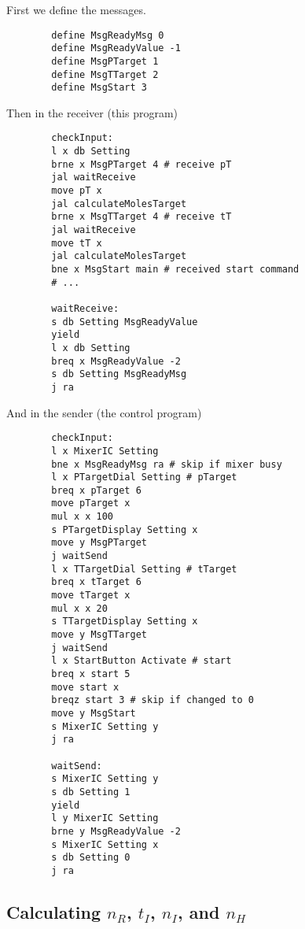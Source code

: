 \documentclass{article}
\begin{document}
\begin{paracol}{2}
    First we define the messages.
    \switchcolumn
    \begin{verbatim}
        define MsgReadyMsg 0
        define MsgReadyValue -1
        define MsgPTarget 1
        define MsgTTarget 2
        define MsgStart 3
    \end{verbatim}
    \switchcolumn*
    Then in the receiver (this program)
    \switchcolumn
    \vspace{-1em}
    \begin{verbatim}
        checkInput:
        l x db Setting
        brne x MsgPTarget 4 # receive pT
        jal waitReceive
        move pT x
        jal calculateMolesTarget
        brne x MsgTTarget 4 # receive tT
        jal waitReceive
        move tT x
        jal calculateMolesTarget
        bne x MsgStart main # received start command
        # ...

        waitReceive:
        s db Setting MsgReadyValue
        yield
        l x db Setting
        breq x MsgReadyValue -2
        s db Setting MsgReadyMsg
        j ra
    \end{verbatim}
    \switchcolumn*
    And in the sender (the control program)
    \switchcolumn
    \vspace{-1em}
    \begin{verbatim}
        checkInput:
        l x MixerIC Setting
        bne x MsgReadyMsg ra # skip if mixer busy
        l x PTargetDial Setting # pTarget
        breq x pTarget 6
        move pTarget x
        mul x x 100
        s PTargetDisplay Setting x
        move y MsgPTarget
        j waitSend
        l x TTargetDial Setting # tTarget
        breq x tTarget 6
        move tTarget x
        mul x x 20
        s TTargetDisplay Setting x
        move y MsgTTarget
        j waitSend
        l x StartButton Activate # start
        breq x start 5
        move start x
        breqz start 3 # skip if changed to 0
        move y MsgStart
        s MixerIC Setting y
        j ra

        waitSend:
        s MixerIC Setting y
        s db Setting 1
        yield
        l y MixerIC Setting
        brne y MsgReadyValue -2
        s MixerIC Setting x
        s db Setting 0
        j ra
    \end{verbatim}
\end{paracol}

\subsection{Calculating $n_R$, $t_I$, $n_I$, and $n_H$}
\end{document}
